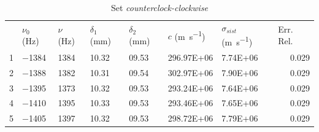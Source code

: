 \documentclass[a4paper,11pt]{article}
\begin{document}
	\begin{table}[htbp]
		\centering
		\caption{Set \emph{counterclock-clockwise}}
		\vspace{0.1cm}		
		\begin{tabular}{rllllllr}
			\rowcolor[rgb]{ .741,  .843,  .933} \multicolumn{1}{l}{Indice} & $\nu_0$ (\si{\hertz}) & $\nu$ (\si{\hertz}) & $\delta_1$ (\si{\milli\meter}) & $\delta_2$ (\si{\milli\meter}) & $c$ (\si{\meter\per\second}) & $\sigma_{sist}$ (\si{\meter\per\second}) & \multicolumn{1}{l}{Err. Rel.} \\
			\rowcolor[rgb]{ .741,  .843,  .933} 1     & \cellcolor[rgb]{ .859,  .859,  .859} \num{-1384} & \cellcolor[rgb]{ .859,  .859,  .859} \num{1384} & \cellcolor[rgb]{ .859,  .859,  .859} \num{10.32} & \cellcolor[rgb]{ .859,  .859,  .859} \num{09.53} & \cellcolor[rgb]{ .859,  .859,  .859} \num{296.97E+06} & \cellcolor[rgb]{ .859,  .859,  .859} \num{7.74E+06} & \cellcolor[rgb]{ .859,  .859,  .859} 0.029 \\
			\rowcolor[rgb]{ .741,  .843,  .933} 2     & \cellcolor[rgb]{ .929,  .929,  .929} \num{-1388} & \cellcolor[rgb]{ .929,  .929,  .929} \num{1382} & \cellcolor[rgb]{ .929,  .929,  .929} \num{10.31} & \cellcolor[rgb]{ .929,  .929,  .929} \num{09.54} & \cellcolor[rgb]{ .929,  .929,  .929} \num{302.97E+06} & \cellcolor[rgb]{ .929,  .929,  .929} \num{7.90E+06} & \cellcolor[rgb]{ .929,  .929,  .929} 0.029 \\
			\rowcolor[rgb]{ .741,  .843,  .933} 3     & \cellcolor[rgb]{ .859,  .859,  .859} \num{-1395} & \cellcolor[rgb]{ .859,  .859,  .859} \num{1373} & \cellcolor[rgb]{ .859,  .859,  .859} \num{10.32} & \cellcolor[rgb]{ .859,  .859,  .859} \num{09.53} & \cellcolor[rgb]{ .859,  .859,  .859} \num{293.24E+06} & \cellcolor[rgb]{ .859,  .859,  .859} \num{7.64E+06} & \cellcolor[rgb]{ .859,  .859,  .859} 0.029 \\
			\rowcolor[rgb]{ .741,  .843,  .933} 4     & \cellcolor[rgb]{ .929,  .929,  .929} \num{-1410} & \cellcolor[rgb]{ .929,  .929,  .929} \num{1395} & \cellcolor[rgb]{ .929,  .929,  .929} \num{10.33} & \cellcolor[rgb]{ .929,  .929,  .929} \num{09.53} & \cellcolor[rgb]{ .929,  .929,  .929} \num{293.46E+06} & \cellcolor[rgb]{ .929,  .929,  .929} \num{7.65E+06} & \cellcolor[rgb]{ .929,  .929,  .929} 0.029 \\
			\rowcolor[rgb]{ .741,  .843,  .933} 5     & \cellcolor[rgb]{ .859,  .859,  .859} \num{-1405} & \cellcolor[rgb]{ .859,  .859,  .859} \num{1397} & \cellcolor[rgb]{ .859,  .859,  .859} \num{10.32} & \cellcolor[rgb]{ .859,  .859,  .859} \num{09.53} & \cellcolor[rgb]{ .859,  .859,  .859} \num{298.72E+06} & \cellcolor[rgb]{ .859,  .859,  .859} \num{7.79E+06} & \cellcolor[rgb]{ .859,  .859,  .859} 0.029 \\

\end{tabular}
\end{table}
\end{document}

